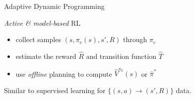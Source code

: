 \documentclass{cognito}
\begin{document}
\begin{note}{Adaptive Dynamic Programming}
	\begin{mdframed}[linecolor=black!25!white]
		\emph{Active \& model-based} RL
	\end{mdframed}
	\begin{itemize}
	\item collect samples $(s, \pi_e(s), s', R)$ through $\pi_e$
	\item estimate the reward $\hat{R}$ and transition function $\hat{T}$
	\item use \emph{offline} planning to compute $\hat{V}^{\pi_0}(s)$ or $\hat{\pi}^*$
	\end{itemize}
	\begin{remark} Similar to supervised learning for $\{ (s, a) \to (s',R) \}$ data.
	\end{remark}
	\vspace{-5pt}
\end{note}

%
\end{document}

